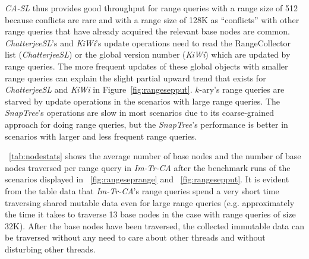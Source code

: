 \documentclass[a4paper,UKenglish]{oasics}
\newcommand{\kary}{\mbox{$k$-ary}\xspace}
\begin{document}
\emph{CA-SL} thus provides good throughput for range queries with a range size of 512 because conflicts are rare and with a range size of 128K as ``conflicts'' with other range queries that have already acquired the relevant base nodes are common. %
%
\emph{ChatterjeeSL}'s and \emph{KiWi}'s update operations need to read the RangeCollector list (\emph{ChatterjeeSL}) or the global version number (\emph{KiWi}) which are updated by range queries.
The more frequent updates of these global objects with smaller range queries can explain the slight partial upward trend that exists for \emph{ChatterjeeSL} and \emph{KiWi} in Figure~\ref{fig:rangesepput}.
\kary{}'s range queries are starved by update operations in the scenarios with large range queries.
The \emph{SnapTree}'s operations are slow in most scenarios due to its coarse-grained approach for doing range queries, but the \emph{SnapTree}'s performance is better in scenarios with larger and less frequent range queries.

\tablename~\ref{tab:nodestats} shows the average number of base nodes and the number of base nodes traversed per range query in \emph{Im-Tr-CA} after the benchmark runs of the scenarios displayed in \figurename~\ref{fig:rangeseprange} and \figurename~\ref{fig:rangesepput}.
It is evident from the table data that \emph{Im-Tr-CA}'s range queries spend a very short time traversing shared mutable data even for large range queries (e.g. approximately the time it takes to traverse 13 base nodes in the case with range queries of size 32K).
After the base nodes have been traversed, the collected immutable data can be traversed without any need to care about other threads and without disturbing other threads.
 
\end{document}
